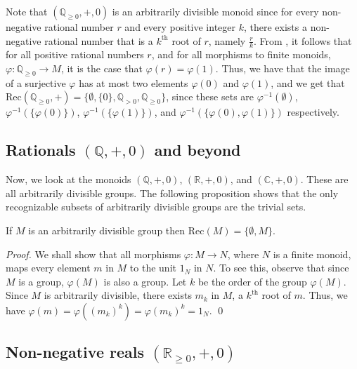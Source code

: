 \documentclass{llncs}
\begin{document}
Note that $(\mathbb{Q}_{\geq 0}, +, 0)$ is an arbitrarily divisible monoid since for every non-negative rational number $r$ and every positive integer $k$, there exists a non-negative rational number that is a $k^{\text{th}}$ root of $r$, namely $\frac{r}{k}$.
From , it follows that for all positive rational numbers $r$, and for all morphisms to finite monoids, $\varphi: \mathbb{Q}_{\geq 0} \to M$, it is the case that $\varphi(r) = \varphi(1)$.
Thus, we have that the image of a surjective $\varphi$ has at most two elements $\varphi(0)$ and $\varphi(1)$, and we get that $\text{Rec}(\mathbb{Q}_{\geq 0}, +) = \{\emptyset, \{0\}, \mathbb{Q}_{> 0}, \mathbb{Q}_{\geq 0}\}$, since these sets are 
$\varphi^{-1}(\emptyset)$,
$\varphi^{-1}(\{\varphi(0)\})$,
$\varphi^{-1}(\{\varphi(1)\})$, and
$\varphi^{-1}(\{\varphi(0), \varphi(1)\})$ respectively.

\subsection{Rationals $(\mathbb{Q}, +, 0)$ and beyond}

Now, we look at the monoids $(\mathbb{Q}, +, 0)$, $(\mathbb{R}, +, 0)$, and $(\mathbb{C}, +, 0)$.
These are all arbitrarily divisible groups. 
The following proposition shows that the only recognizable subsets of arbitrarily divisible groups are the trivial sets.

\begin{proposition}
    If $M$ is an arbitrarily divisible group then $	\text{Rec}(M) = \{ \emptyset, M \}$.
\label{prop:Rec-arbitrarily-divisible-group-trivial}
\end{proposition}

\begin{proof}
We shall show that all morphisms $\varphi:M \rightarrow N$, where $N$ is a finite monoid, maps every element $m$ in \(M\) to the unit $1_{N}$ in $N$. 
To see this, observe that since $M$ is a group, $\varphi(M)$ is also a group. 
Let $k$ be the order of the group $\varphi(M)$. 
Since $M$ is arbitrarily divisible, there exists $m_{k}$ in $M$, a \(k^{\text{th}}\) root of \(m\). 
Thus, we have $\varphi(m) = \varphi((m_{k})^{k}) = {\varphi(m_{k})}^{k} = 1_{N}$.
  \qed
\end{proof}

\subsection{Non-negative reals $(\mathbb{R}_{\geq 0}, +, 0)$}
\end{document}
